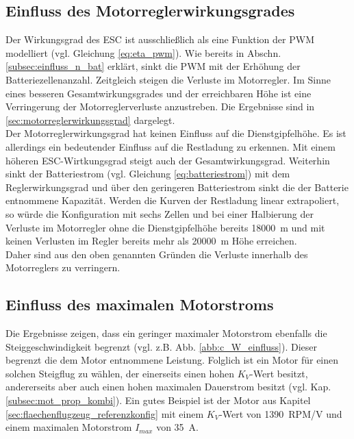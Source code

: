 \subsection{Einfluss des Motorreglerwirkungsgrades}
\label{subsec:einfluss_eta_pwm}
Der Wirkungsgrad des ESC ist ausschließlich als eine Funktion der PWM modelliert (vgl. Gleichung \eqref{eq:eta_pwm}). Wie bereits in Abschn. \ref{subsec:einfluss_n_bat} erklärt, sinkt die PWM mit der Erhöhung der Batteriezellenanzahl. Zeitgleich steigen die Verluste im Motorregler. Im Sinne eines besseren Gesamtwirkungsgrades und der erreichbaren Höhe ist eine Verringerung der Motorreglerverluste anzustreben. Die Ergebnisse sind in \ref{sec:motorreglerwirkungsgrad} dargelegt. \\
Der Motorreglerwirkungsgrad hat keinen Einfluss auf die Dienstgipfelhöhe. Es ist allerdings ein bedeutender Einfluss auf die Restladung zu erkennen. Mit einem höheren ESC-Wirtkungsgrad steigt auch der Gesamtwirkungsgrad. Weiterhin sinkt der Batteriestrom (vgl. Gleichung \eqref{eq:batteriestrom}) mit dem Reglerwirkungsgrad und über den geringeren Batteriestrom sinkt die der Batterie entnommene Kapazität. Werden die Kurven der Restladung linear extrapoliert, so würde die Konfiguration mit sechs Zellen und bei einer Halbierung der Verluste im Motorregler ohne die Dienstgipfelhöhe bereits \SI{18000}{m} und mit keinen Verlusten im Regler bereits mehr als \SI{20000}{m} Höhe erreichen. \\
Daher sind aus den oben genannten Gründen die Verluste innerhalb des Motorreglers zu verringern. 


\subsection{Einfluss des maximalen Motorstroms}
\label{subsec:einfluss_imax}
Die Ergebnisse zeigen, dass ein geringer maximaler Motorstrom ebenfalls die Steiggeschwindigkeit begrenzt (vgl. z.B. Abb. \ref{abb:c_W_einfluss}). Dieser begrenzt die dem Motor entnommene Leistung. 
Folglich ist ein Motor für einen solchen Steigflug zu wählen, der einerseits einen hohen \ensuremath{K_V}-Wert besitzt, andererseits aber auch einen hohen maximalen Dauerstrom besitzt (vgl. Kap. \ref{subsec:mot_prop_kombi}). Ein gutes Beispiel ist der Motor aus Kapitel \ref{sec:flaechenflugzeug_referenzkonfig} mit einem \ensuremath{K_V}-Wert von \SI{1390}{RPM/V} und einem maximalen Motorstrom \ensuremath{I_{max}} von \SI{35}{A}.




